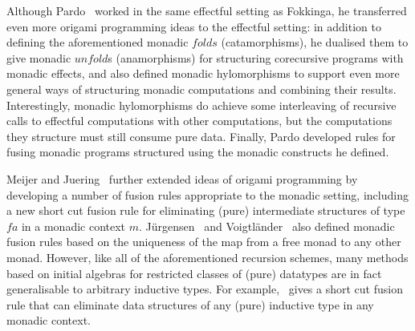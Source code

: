 \documentclass{jfp1}
\begin{document}
Although Pardo~\cite{par93} worked in the same effectful setting as
Fokkinga, he transferred even more origami programming ideas to the
effectful setting: in addition to defining the aforementioned monadic
$\mathit{fold}s$ (catamorphisms), he dualised them to give monadic
$\mathit{unfold}$s (anamorphisms) for structuring corecursive programs
with monadic effects, and also defined monadic hylomorphisms to
support even more general ways of structuring monadic computations and
combining their results. Interestingly, monadic hylomorphisms do
achieve some interleaving of recursive calls to effectful computations
with other computations, but the computations they structure must
still consume pure data. Finally, Pardo developed rules for fusing
monadic programs structured using the monadic constructs he defined.

Meijer and Juering~\cite{mj95} further extended ideas of origami
programming by developing a number of fusion rules appropriate to the
monadic setting, including a new short cut fusion rule for eliminating
(pure) intermediate structures of type $fa$ in a monadic context $m$.
J\"urgensen~\cite{jue02} and Voigtl\"ander~\cite{voi08} also defined
monadic fusion rules based on the uniqueness of the map from a free
monad to any other monad. However, like all of the aforementioned
recursion schemes, many methods based on initial algebras for
restricted classes of (pure) datatypes are in fact generalisable to
arbitrary inductive types. For example,~\cite{gj09} gives a short cut
fusion rule that can eliminate data structures of any (pure) inductive
type in any monadic context.
\end{document}
